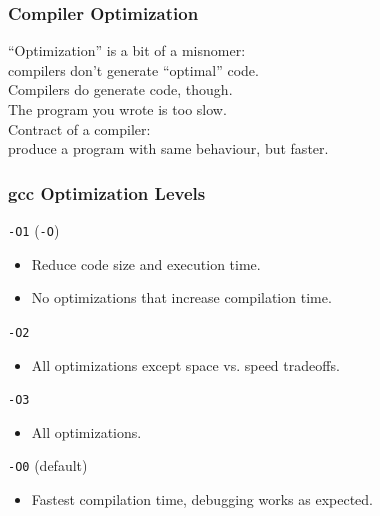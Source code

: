 \begin{frame}
  \frametitle{Compiler Optimization}

  
    ``Optimization'' is a bit of a misnomer:\\
      \qquad compilers don't generate ``optimal'' code.\\[1em]

    Compilers do generate  code, though.\\[1em]

    The program you wrote is too slow. \\
    Contract of a compiler: \\
    \qquad produce a program with same behaviour, but faster.
  
\end{frame}

\begin{frame}
  \frametitle{gcc Optimization Levels}

  
  {\tt -O1} ({\tt -O})

  \begin{itemize}
    \item Reduce code size and execution time.
    \item No optimizations that increase compilation time.
  \end{itemize}

  {\tt -O2}

  \begin{itemize}
    \item All optimizations except space vs. speed tradeoffs.
  \end{itemize}
  
  {\tt -O3}

  \begin{itemize}
    \item All optimizations.
  \end{itemize}

  {\tt -O0} (default)

  \begin{itemize}
    \item Fastest compilation time, debugging works as expected.
  \end{itemize}
  
\end{frame}

